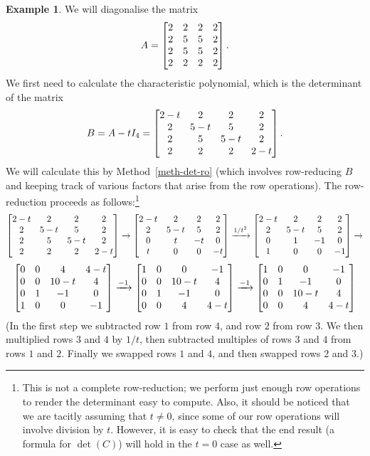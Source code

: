 \documentclass[reqno]{amsart}
\theoremstyle{definition}
\newtheorem{example}[theorem]{Example}
\begin{document}
\begin{example}\label{eg-diag-v}
 We will diagonalise the matrix
 \[ A = \left[\begin{matrix} 2&2&2&2 \\ 2&5&5&2 \\ 2&5&5&2 \\ 2&2&2&2 \end{matrix}\right]. \]
 We first need to calculate the characteristic polynomial, which is
 the determinant of the matrix
 \[ B = A-tI_4 = 
      \left[\begin{matrix} 2-t&2&2&2 \\ 2&5-t&5&2 \\ 2&5&5-t&2 \\ 2&2&2&2-t \end{matrix}\right].
 \]
 We will calculate this by Method~\ref{meth-det-ro} (which involves
 row-reducing $B$ and keeping track of various factors that arise from
 the row operations).  The row-reduction proceeds as follows:\footnote{%
 This is not a complete row-reduction; we perform just enough
 row operations to render the determinant easy to compute.
 Also, it should be noticed that we are tacitly assuming that
 $t \neq 0$, since some of our row operations will involve
 division by $t$.  However, it is easy to check that the
 end result (a formula for $\det(C)$) will hold in the
 $t = 0$ case as well.}
 \[
    \left[\begin{matrix} 2-t & 2   & 2   & 2 \\
         2   & 5-t & 5   & 2 \\
         2   & 5   & 5-t & 2 \\
         2   & 2   & 2   & 2-t \end{matrix}\right]
    \xrightarrow{}
    \left[\begin{matrix} 2-t & 2   & 2   & 2 \\
         2   & 5-t & 5   & 2 \\
         0   & t   & -t  & 0 \\
         t   & 0   & 0   & -t \end{matrix}\right]
    \xrightarrow{1/t^2}
    \left[\begin{matrix} 2-t & 2   & 2   & 2 \\
         2   & 5-t & 5   & 2 \\
         0   & 1   & -1  & 0 \\
         1   & 0   & 0   & -1 \end{matrix}\right]
    \xrightarrow{}
 \] \[
    \left[\begin{matrix} 0   & 0   & 4    & 4-t \\
         0   & 0   & 10-t & 4 \\
         0   & 1   & -1   & 0 \\
         1   & 0   & 0    & -1 \end{matrix}\right]
    \xrightarrow{-1}
    \left[\begin{matrix} 1   & 0   & 0    & -1 \\
         0   & 0   & 10-t & 4 \\
         0   & 1   & -1   & 0 \\
         0   & 0   & 4    & 4-t \end{matrix}\right]
    \xrightarrow{-1}
    \left[\begin{matrix} 1   & 0   & 0    & -1 \\
         0   & 1   & -1   & 0 \\
         0   & 0   & 10-t & 4 \\
         0   & 0   & 4    & 4-t \end{matrix}\right]         
 \]
 (In the first step we subtracted row $1$ from row $4$, and row $2$
 from row $3$.  We then multiplied rows $3$ and $4$ by $1/t$, then
 subtracted multiples of rows $3$ and $4$ from rows $1$ and $2$.
 Finally we swapped rows $1$ and $4$, and then swapped rows $2$ and
 $3$.) 


\end{example}
\end{document}
